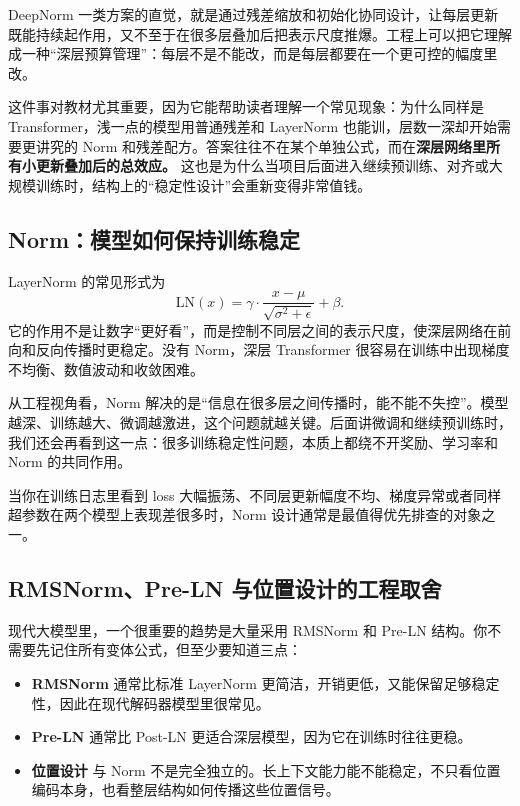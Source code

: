 DeepNorm 一类方案的直觉，就是通过残差缩放和初始化协同设计，让每层更新既能持续起作用，又不至于在很多层叠加后把表示尺度推爆。工程上可以把它理解成一种“深层预算管理”：每层不是不能改，而是每层都要在一个更可控的幅度里改。

这件事对教材尤其重要，因为它能帮助读者理解一个常见现象：为什么同样是 Transformer，浅一点的模型用普通残差和 LayerNorm 也能训，层数一深却开始需要更讲究的 Norm 和残差配方。答案往往不在某个单独公式，而在\textbf{深层网络里所有小更新叠加后的总效应。} 这也是为什么当项目后面进入继续预训练、对齐或大规模训练时，结构上的“稳定性设计”会重新变得非常值钱。

\subsection{Norm：模型如何保持训练稳定}
LayerNorm 的常见形式为
\[
\mathrm{LN}(x)=\gamma \cdot \frac{x-\mu}{\sqrt{\sigma^2+\epsilon}}+\beta.
\]
它的作用不是让数字“更好看”，而是控制不同层之间的表示尺度，使深层网络在前向和反向传播时更稳定。没有 Norm，深层 Transformer 很容易在训练中出现梯度不均衡、数值波动和收敛困难。

从工程视角看，Norm 解决的是“信息在很多层之间传播时，能不能不失控”。模型越深、训练越大、微调越激进，这个问题就越关键。后面讲微调和继续预训练时，我们还会再看到这一点：很多训练稳定性问题，本质上都绕不开奖励、学习率和 Norm 的共同作用。

\begin{note}
当你在训练日志里看到 loss 大幅振荡、不同层更新幅度不均、梯度异常或者同样超参数在两个模型上表现差很多时，Norm 设计通常是最值得优先排查的对象之一。
\end{note}

\subsection{RMSNorm、Pre-LN 与位置设计的工程取舍}
现代大模型里，一个很重要的趋势是大量采用 RMSNorm 和 Pre-LN 结构。你不需要先记住所有变体公式，但至少要知道三点：
\begin{itemize}
  \item \textbf{RMSNorm} 通常比标准 LayerNorm 更简洁，开销更低，又能保留足够稳定性，因此在现代解码器模型里很常见。
  \item \textbf{Pre-LN} 通常比 Post-LN 更适合深层模型，因为它在训练时往往更稳。
  \item \textbf{位置设计} 与 Norm 不是完全独立的。长上下文能力能不能稳定，不只看位置编码本身，也看整层结构如何传播这些位置信号。
\end{itemize}

